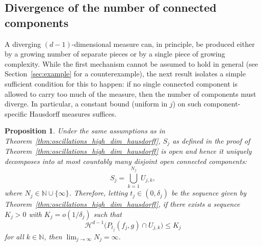 \documentclass[12pt]{article}
\newtheorem{proposition}{Proposition}
\newcommand{\NN}{\mathbb{N}}
\begin{document}
\subsection{Divergence of the number of connected components}\label{subsec:components}

A diverging $(d-1)$-dimensional measure can, in principle, be produced either by a growing number
of separate pieces or by a single piece of growing complexity. While the first mechanism cannot be assumed to hold in general (see Section~\ref{sec:example} for a counterexample), the next result isolates a simple sufficient condition for this to happen: if no single connected component is allowed to carry too much of the measure, then the
number of components must diverge. In particular, a constant bound (uniform in $j$) on such component-specific Hausdorff measures suffices.

\begin{proposition}\label{pro:components_diverge}
Under the same assumptions as in Theorem~\ref{thm:oscillations_high_dim_hausdorff}, $S_j$ as defined in the proof of Theorem~\ref{thm:oscillations_high_dim_hausdorff} is open
and hence it uniquely decomposes into at most countably many disjoint open connected components:
\begin{equation*}
S_j = \bigcup_{k=1}^{N_j} U_{j,k},
\end{equation*}
where $N_j \in \NN \cup \{\infty\}$. Therefore, letting $t_j \in (0, \delta_j)$ be the sequence
given by Theorem~\ref{thm:oscillations_high_dim_hausdorff}, if there exists a sequence $K_j > 0$
with $K_j = o(1/\delta_j)$ such that
\begin{equation*}
\mathcal{H}^{d-1}\bigl(P_{t_j}(f_j,g) \cap U_{j,k}\bigr) \leq K_j
\end{equation*}
for all $k\in\NN$, then
$\lim_{j \to \infty} N_j = \infty$.
\end{proposition}
\end{document}
